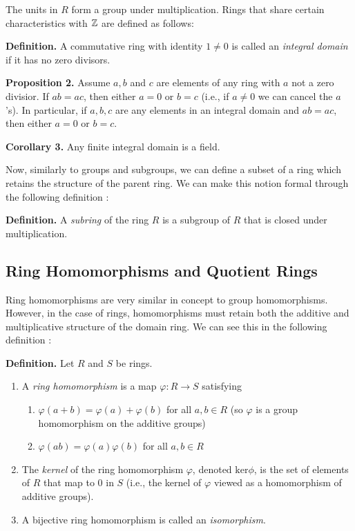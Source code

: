 \documentclass[11pt, reqno]{amsart}
\theoremstyle{plain}
\theoremstyle{definition}
\theoremstyle{example}
\begin{document}
The units in $R$ form a group under multiplication. Rings that share certain characteristics with $\mathbb{Z}$ are defined as follows:

\par
\textbf{Definition.} A commutative ring with identity $1 \neq 0$ is called an \textit{integral domain} if it has no zero divisors.

\par
\textbf{Proposition 2.} Assume $a, b$ and $c$ are elements of any ring with $a$ not a zero divisior. If $ab = ac$, then either $a = 0$ or $b = c$ (i.e., if $a \neq 0$ we can cancel the $a$'s). In particular, if $a, b, c$ are any elements in an integral domain and $ab = ac$, then either $a = 0$ or $b = c$.

\par
\textbf{Corollary 3.} Any finite integral domain is a field.

\par
Now, similarly to groups and subgroups, we can define a subset of a ring which retains the structure of the parent ring. We can make this notion formal through the following definition \cite[\S 7.1, p. 228]{dummit}:

\par
\textbf{Definition.} A \textit{subring} of the ring $R$ is a subgroup of $R$ that is closed under multiplication.

\subsection{Ring Homomorphisms and Quotient Rings}

Ring homomorphisms are very similar in concept to group homomorphisms. However, in the case of rings, homomorphisms must retain both the additive and multiplicative structure of the domain ring. We can see this in the following definition \cite[\S 7.3, p. 239]{dummit}:

\par
\textbf{Definition.} Let $R$ and $S$ be rings.
\begin{enumerate}
\item A \textit{ring homomorphism} is a map $\varphi: R \to S$ satisfying
\begin{enumerate}[label=(\roman*)]

\item $\varphi(a + b) = \varphi(a) + \varphi(b)$ for all $a, b \in R$ (so $\varphi$ is a group homomorphism on the additive groups) 

\item $\varphi(ab) = \varphi(a)\varphi(b)$ for all $a, b \in R$
\end{enumerate}

\item The \textit{kernel} of the ring homomorphism $\varphi$, denoted $\text{ker}\phi$, is the set of elements of $R$ that map to $0$ in $S$ (i.e., the kernel of $\varphi$ viewed as a homomorphism of additive groups).

\item A bijective ring homomorphism is called an \textit{isomorphism}.

\end{enumerate}
\end{document}
